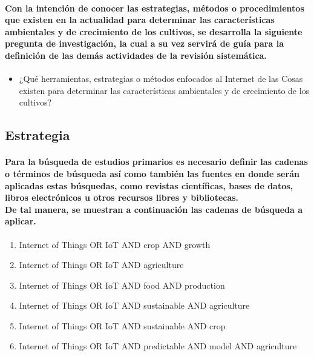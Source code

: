 \documentclass[10pt, twocolumn]{article}
\begin{document}
\paragraph{Con la intención de conocer las estrategias, métodos o procedimientos que existen en la actualidad para determinar las características ambientales y de crecimiento de los cultivos, se desarrolla la siguiente pregunta de investigación, la cual a su vez servirá de guía para la definición de las demás actividades de la revisión sistemática.}
\begin{itemize}
	\item{¿Qué herramientas, estrategias o métodos enfocados al Internet de las Cosas existen para determinar las características ambientales y de crecimiento de los cultivos?}
\end{itemize}

\subsection{Estrategia}
\paragraph{Para la búsqueda de estudios primarios es necesario definir las cadenas o términos de búsqueda así como también las fuentes en donde serán aplicadas estas búsquedas, como revistas científicas, bases de datos, libros electrónicos u otros recursos libres y bibliotecas. \\ De tal manera, se muestran a continuación las cadenas de búsqueda a aplicar.}
\begin{enumerate}
	\item{Internet of Things OR IoT AND crop AND growth}
	\item{Internet of Things OR IoT AND agriculture}
	\item{Internet of Things OR IoT AND food AND production}
	\item{Internet of Things OR IoT AND sustainable AND agriculture}
	\item{Internet of Things OR IoT AND sustainable AND crop}
	\item{Internet of Things OR IoT AND predictable AND model AND agriculture}
\end{enumerate}
\end{document}
